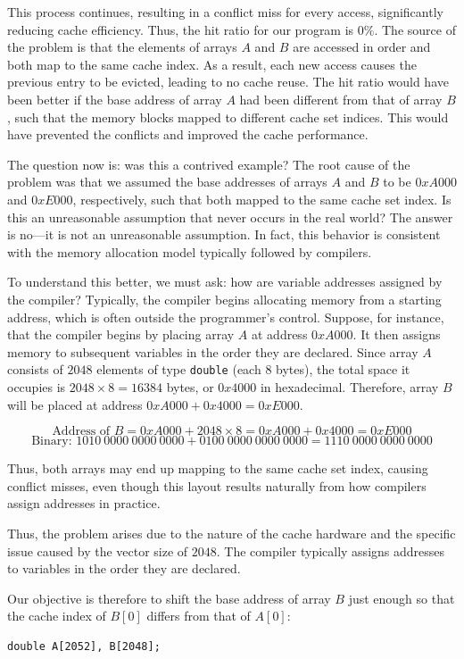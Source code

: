 \documentclass[12pt]{book}
\begin{document}
This process continues, resulting in a conflict miss for every access, significantly reducing cache efficiency. Thus, the hit ratio for our program is $0\%$. The source of the problem is that the elements of arrays $A$ and $B$ are accessed in order and both map to the same cache index. As a result, each new access causes the previous entry to be evicted, leading to no cache reuse. The hit ratio would have been better if the base address of array $A$ had been different from that of array $B$, such that the memory blocks mapped to different cache set indices. This would have prevented the conflicts and improved the cache performance.

The question now is: was this a contrived example? The root cause of the problem was that we assumed the base addresses of arrays $A$ and $B$ to be $0xA000$ and $0xE000$, respectively, such that both mapped to the same cache set index. Is this an unreasonable assumption that never occurs in the real world? The answer is no—it is not an unreasonable assumption. In fact, this behavior is consistent with the memory allocation model typically followed by compilers.

To understand this better, we must ask: how are variable addresses assigned by the compiler? Typically, the compiler begins allocating memory from a starting address, which is often outside the programmer’s control. Suppose, for instance, that the compiler begins by placing array $A$ at address $0xA000$. It then assigns memory to subsequent variables in the order they are declared. Since array $A$ consists of $2048$ elements of type \texttt{double} (each 8 bytes), the total space it occupies is $2048 \times 8 = 16384$ bytes, or $0x4000$ in hexadecimal. Therefore, array $B$ will be placed at address $0xA000 + 0x4000 = 0xE000$.

\[
\text{Address of } B = 0xA000 + 2048 \times 8 = 0xA000 + 0x4000 = 0xE000
\]
\[
\text{Binary: } 1010\ 0000\ 0000\ 0000 + 0100\ 0000\ 0000\ 0000 = 1110\ 0000\ 0000\ 0000
\]

Thus, both arrays may end up mapping to the same cache set index, causing conflict misses, even though this layout results naturally from how compilers assign addresses in practice.

Thus, the problem arises due to the nature of the cache hardware and the specific issue caused by the vector size of $2048$. The compiler typically assigns addresses to variables in the order they are declared.

Our objective is therefore to shift the base address of array $B$ just enough so that the cache index of $B[0]$ differs from that of $A[0]$:
\begin{lstlisting}
double A[2052], B[2048];
\end{lstlisting}
\end{document}
